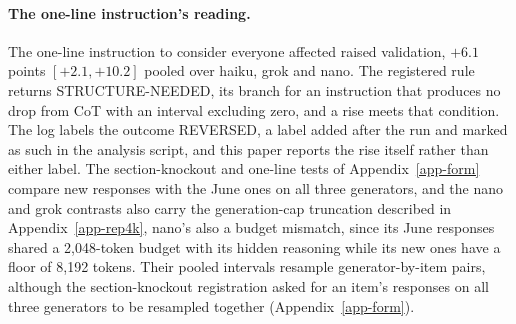 \paragraph{The one-line instruction's reading.}
The one-line instruction to consider everyone affected raised validation,
$+6.1$ points $[+2.1, +10.2]$ pooled over haiku, grok and nano. The registered
rule returns STRUCTURE-NEEDED, its branch for an instruction that produces no
drop from CoT with an interval excluding zero, and a rise meets that
condition. The log labels the outcome REVERSED, a label added after the run
and marked as such in the analysis script, and this paper reports the rise
itself rather than either label.
The section-knockout and one-line tests of Appendix~\ref{app-form} compare
new responses with the June ones on all three generators, and the nano and
grok contrasts also carry the generation-cap truncation described in
Appendix~\ref{app-rep4k}, nano's also a budget mismatch, since its June
responses shared a 2,048-token budget with its hidden reasoning while its new
ones have a floor of 8,192 tokens.
Their pooled intervals resample generator-by-item pairs, although the
section-knockout registration asked for an item's responses on all three
generators to be resampled together (Appendix~\ref{app-form}).


